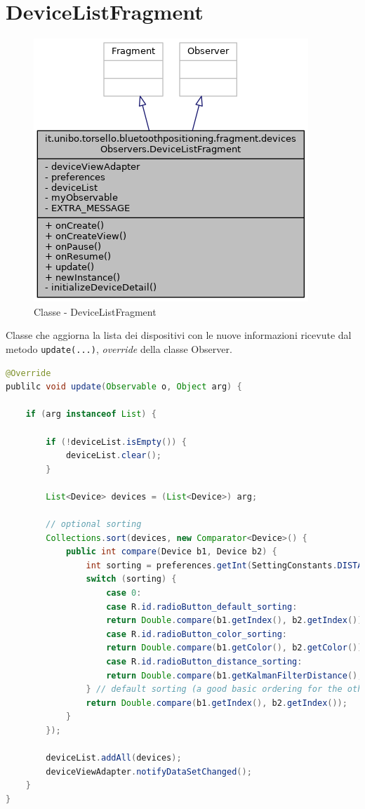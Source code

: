 \newpage
\section{DeviceListFragment}\label{ch:device_list}
\begin{figure}[ph]
	\centering
	\includegraphics[width=0.5\linewidth]{img/uml/class/classit_1_1unibo_1_1torsello_1_1bluetoothpositioning_1_1fragment_1_1devicesObservers_1_1DeviceListFragment__inherit__graph.png}
	\caption{Classe - DeviceListFragment}
\end{figure}

Classe che aggiorna la lista dei dispositivi con le nuove informazioni ricevute dal metodo \texttt{update(...)}, \textit{override} della classe Observer.
\begin{lstlisting}[language=Java]
@Override
publilc void update(Observable o, Object arg) {
	
	if (arg instanceof List) {
		
		if (!deviceList.isEmpty()) {
			deviceList.clear();
		}
		
		List<Device> devices = (List<Device>) arg;
		
		// optional sorting
		Collections.sort(devices, new Comparator<Device>() {
			public int compare(Device b1, Device b2) {
				int sorting = preferences.getInt(SettingConstants.DISTANCE_SORTING, 0);
				switch (sorting) {
					case 0:
					case R.id.radioButton_default_sorting:
					return Double.compare(b1.getIndex(), b2.getIndex());
					case R.id.radioButton_color_sorting:
					return Double.compare(b1.getColor(), b2.getColor());
					case R.id.radioButton_distance_sorting:
					return Double.compare(b1.getKalmanFilterDistance(), b2.getKalmanFilterDistance());
				} // default sorting (a good basic ordering for the other options)
				return Double.compare(b1.getIndex(), b2.getIndex());
			}
		});
		
		deviceList.addAll(devices);
		deviceViewAdapter.notifyDataSetChanged();
	}
}
\end{lstlisting}

